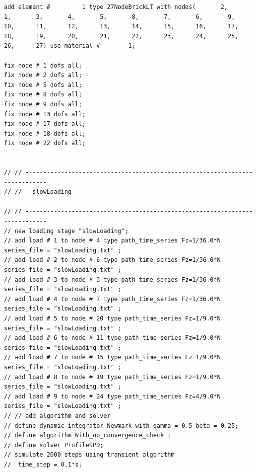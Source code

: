 \begin{lstlisting}
add element #         1 type 27NodeBrickLT with nodes(       2,       1,       3,       4,       5,       8,       7,       6,       9,      10,      11,      12,      13,      14,      15,      16,      17,      18,      19,      20,      21,      22,      23,      24,      25,      26,      27) use material #        1; 

fix node # 1 dofs all;
fix node # 2 dofs all;
fix node # 5 dofs all;
fix node # 8 dofs all;
fix node # 9 dofs all;
fix node # 13 dofs all;
fix node # 17 dofs all;
fix node # 18 dofs all;
fix node # 22 dofs all;

  
// // ----------------------------------------------------------------------------
// // --slowLoading---------------------------------------------------------------
// // ----------------------------------------------------------------------------
// new loading stage "slowLoading";
// add load # 1 to node # 4 type path_time_series Fz=1/36.0*N series_file = "slowLoading.txt" ; 
// add load # 2 to node # 6 type path_time_series Fz=1/36.0*N series_file = "slowLoading.txt" ; 
// add load # 3 to node # 3 type path_time_series Fz=1/36.0*N series_file = "slowLoading.txt" ; 
// add load # 4 to node # 7 type path_time_series Fz=1/36.0*N series_file = "slowLoading.txt" ; 
// add load # 5 to node # 20 type path_time_series Fz=1/9.0*N series_file = "slowLoading.txt" ; 
// add load # 6 to node # 11 type path_time_series Fz=1/9.0*N series_file = "slowLoading.txt" ; 
// add load # 7 to node # 15 type path_time_series Fz=1/9.0*N series_file = "slowLoading.txt" ; 
// add load # 8 to node # 19 type path_time_series Fz=1/9.0*N series_file = "slowLoading.txt" ; 
// add load # 9 to node # 24 type path_time_series Fz=4/9.0*N series_file = "slowLoading.txt" ; 
// // add algorithm and solver
// define dynamic integrator Newmark with gamma = 0.5 beta = 0.25;
// define algorithm With_no_convergence_check ;
// define solver ProfileSPD;
// simulate 2000 steps using transient algorithm 
//  time_step = 0.1*s;


\end{lstlisting}
